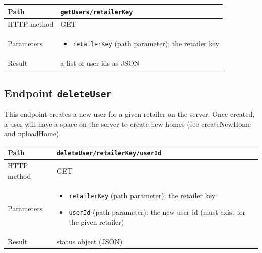 \documentclass[a4paper]{report}
\begin{document}
\begin{center}
\begin{tabularx} {\textwidth} { | l | X | }

\hline

Path & \texttt{getUsers/retailerKey} \\

\hline

HTTP method & GET \\

\hline

Parameters & \begin{itemize}[leftmargin=*,noitemsep,topsep=0px]
\item \texttt{retailerKey} (path parameter): the retailer key
\end{itemize} \\

\hline

Result & a list of user ids as JSON \\

\hline

\end{tabularx}
\end{center}

\subsection{Endpoint \texttt{deleteUser}}

This endpoint creates a new user for a given retailer on the server. Once created, a user will have a space on the server to create new homes (see createNewHome and uploadHome).

\begin{center}
\begin{tabularx} {\textwidth} { | l | X | }

\hline

Path & \texttt{deleteUser/retailerKey/userId} \\

\hline

HTTP method & GET \\

\hline

Parameters & \begin{itemize}[leftmargin=*,noitemsep,topsep=0px]
\item \texttt{retailerKey} (path parameter): the retailer key
\item \texttt{userId} (path parameter): the new user id (must exist for the given retailer) 
\end{itemize} \\

\hline

Result & status object (JSON) \\

\hline

\end{tabularx}
\end{center}
\end{document}
